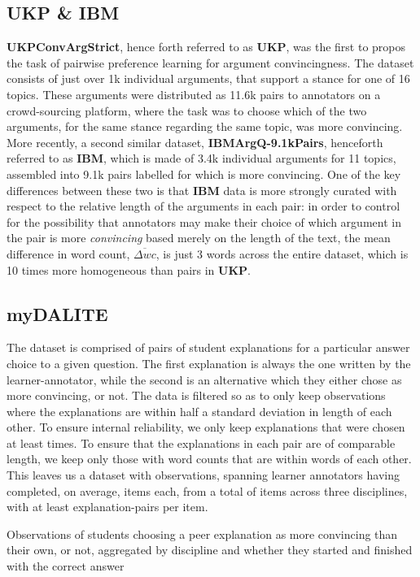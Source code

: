 \documentclass[runningheads]{llncs}
\begin{document}
\subsection{UKP \& IBM}
\textbf{UKPConvArgStrict}\cite{habernal_which_2016}, hence forth referred to as 
\textbf{UKP}, was the first to propos the task of pairwise preference learning 
for argument convincingness. The dataset consists of just over 1k individual 
arguments, that support a stance for one of 16 topics. These arguments were 
distributed as 11.6k pairs to annotators on a crowd-sourcing platform, where 
the task was to choose which of the two arguments, for the same stance 
regarding the same topic, was more convincing. More recently, a second similar 
dataset, \textbf{IBMArgQ-9.1kPairs}\cite{toledo_automatic_2019}, henceforth 
referred to as \textbf{IBM}, which is made of 3.4k individual arguments for 11 
topics, assembled into 9.1k pairs labelled for which is more convincing. One of 
the key differences between these two is that \textbf{IBM} data is more 
strongly curated with respect to the relative length of the arguments in each 
pair: in order to control for the possibility that annotators may make their 
choice of which argument in the pair is more \textit{convincing} based merely 
on the length of the text, the mean difference in word count, $\overline{\Delta 
wc}$, is just 3 words across the entire dataset, which is 10 times more 
homogeneous than pairs in \textbf{UKP}.



\subsection{myDALITE}
The dataset is comprised of pairs of student explanations for a particular 
answer choice to a given question. The first explanation is always the one 
written by the learner-annotator, while the second is an alternative which 
they either chose as more convincing, or not. The data is filtered so as 
to only keep observations where the explanations are within half a standard 
deviation in length of each other. To ensure internal reliability, we only keep 
explanations that were chosen at least times. To ensure 
that the explanations in each pair 
are of comparable length, we keep only those with word counts that are within  
words of each other. This leaves us a dataset 
with observations, spanning learner 
annotators having completed, on average, items 
each, from a total of items across three disciplines, 
with at least explanation-pairs per item.
\begin{table}
	\caption{Observations of students choosing a peer explanation as 
		more 
		convincing than their own, or not, aggregated by discipline and whether 
		they 
		started and finished with the correct answer}
	
	
	
	\label{tab:transitions_by_discipline}
\end{table}
\end{document}
